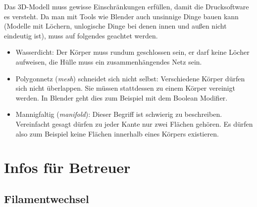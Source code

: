 \documentclass{\basedir/fablab-document}
\newcommand{\fachbegriff}[1]{(\textit{#1})}
\begin{document}
	Das 3D-Modell muss gewisse Einschränkungen erfüllen, damit die Drucksoftware es versteht. Da man mit Tools wie Blender auch unsinnige Dinge bauen kann (Modelle mit Löchern, unlogische Dinge bei denen innen und außen nicht eindeutig ist), muss auf folgendes geachtet werden.
	\begin{itemize}
		\item Wasserdicht: Der Körper muss rundum geschlossen sein, er darf keine
		Löcher aufweisen,  die Hülle muss ein zusammenhängendes Netz sein.
		\item Polygonnetz \fachbegriff{mesh} schneidet sich nicht selbst: Verschiedene
		Körper dürfen sich nicht überlappen. Sie müssen stattdessen zu einem
		Körper vereinigt werden. In Blender geht dies zum Beispiel mit dem
		Boolean Modifier.
		\item Mannigfaltig \fachbegriff{manifold}: Dieser Begriff ist schwierig zu
		beschreiben. Vereinfacht gesagt dürfen zu jeder Kante nur zwei Flächen
		gehören. Es dürfen also zum Beispiel keine Flächen innerhalb eines
		Körpers existieren.
	\end{itemize}
	
	
	\section{Infos für Betreuer}
	
	\subsection{Filamentwechsel}\label{filamentwechsel}
	
\end{document}
